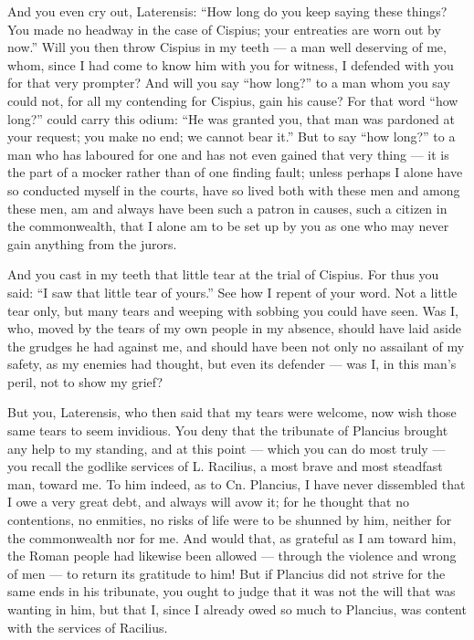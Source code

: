  And you even cry out, Laterensis: ``How long do you keep saying these things? You made no headway in the case of Cispius; your entreaties are worn out by now.'' Will you then throw Cispius in my teeth --- a man well deserving of me, whom, since I had come to know him with you for witness, I defended with you for that very prompter? And will you say ``how long?'' to a man whom you say could not, for all my contending for Cispius, gain his cause? For that word ``how long?'' could carry this odium: ``He was granted you, that man was pardoned at your request; you make no end; we cannot bear it.'' But to say ``how long?'' to a man who has laboured for one and has not even gained that very thing --- it is the part of a mocker rather than of one finding fault; unless perhaps I alone have so conducted myself in the courts, have so lived both with these men and among these men, am and always have been such a patron in causes, such a citizen in the commonwealth, that I alone am to be set up by you as one who may never gain anything from the jurors.

 And you cast in my teeth that little tear at the trial of Cispius. For thus you said: ``I saw that little tear of yours.'' See how I repent of your word. Not a little tear only, but many tears and weeping with sobbing you could have seen. Was I, who, moved by the tears of my own people in my absence, should have laid aside the grudges he had against me, and should have been not only no assailant of my safety, as my enemies had thought, but even its defender --- was I, in this man's peril, not to show my grief?

 But you, Laterensis, who then said that my tears were welcome, now wish those same tears to seem invidious. You deny that the tribunate of Plancius brought any help to my standing, and at this point --- which you can do most truly --- you recall the godlike services of L. Racilius, a most brave and most steadfast man, toward me. To him indeed, as to Cn. Plancius, I have never dissembled that I owe a very great debt, and always will avow it; for he thought that no contentions, no enmities, no risks of life were to be shunned by him, neither for the commonwealth nor for me. And would that, as grateful as I am toward him, the Roman people had likewise been allowed --- through the violence and wrong of men --- to return its gratitude to him! But if Plancius did not strive for the same ends in his tribunate, you ought to judge that it was not the will that was wanting in him, but that I, since I already owed so much to Plancius, was content with the services of Racilius.

